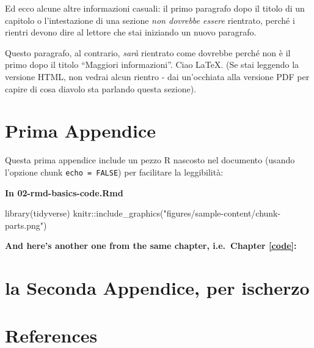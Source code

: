 \documentclass[a4paper, 11pt, nobind]{templates/ociamthesis}
\newenvironment{Shaded}{\begin{snugshade}}{\end{snugshade}}
\newcommand{\FunctionTok}[1]{\textcolor[rgb]{0.00,0.00,0.00}{#1}}
\newcommand{\NormalTok}[1]{#1}
\newcommand{\SpecialCharTok}[1]{\textcolor[rgb]{0.00,0.00,0.00}{#1}}
\newcommand{\StringTok}[1]{\textcolor[rgb]{0.31,0.60,0.02}{#1}}
\renewenvironment{Shaded}
{
  \vspace{10pt}%
  \begin{snugshade}%
}{%
  \end{snugshade}%
  \vspace{8pt}%
}
\begin{document}
Ed ecco alcune altre informazioni casuali:
il primo paragrafo dopo il titolo di un capitolo o l'intestazione di una sezione \emph{non dovrebbe essere} rientrato, perché i rientri devono dire al lettore che stai iniziando un nuovo paragrafo.

Questo paragrafo, al contrario, \emph{sarà} rientrato come dovrebbe perché non è il primo dopo il titolo ``Maggiori informazioni''.
Ciao LaTeX. (Se stai leggendo la versione HTML, non vedrai alcun rientro - dai un'occhiata alla versione PDF per capire di cosa diavolo sta parlando questa sezione).

\startappendices

\hypertarget{prima-appendice}{%
\chapter{Prima Appendice}\label{prima-appendice}}

Questa prima appendice include un pezzo R nascosto nel documento (usando l'opzione chunk \texttt{echo\ =\ FALSE}) per facilitare la leggibilità:

\textbf{In 02-rmd-basics-code.Rmd}

\begin{Shaded}
\begin{Highlighting}[]
\FunctionTok{library}\NormalTok{(tidyverse)}
\NormalTok{knitr}\SpecialCharTok{::}\FunctionTok{include\_graphics}\NormalTok{(}\StringTok{"figures/sample{-}content/chunk{-}parts.png"}\NormalTok{)}
\end{Highlighting}
\end{Shaded}

\textbf{And here's another one from the same chapter, i.e.~Chapter \ref{code}:}

\hypertarget{la-seconda-appendice-per-ischerzo}{%
\chapter{la Seconda Appendice, per ischerzo}\label{la-seconda-appendice-per-ischerzo}}

\hypertarget{references}{%
\chapter*{References}\label{references}}
\end{document}
